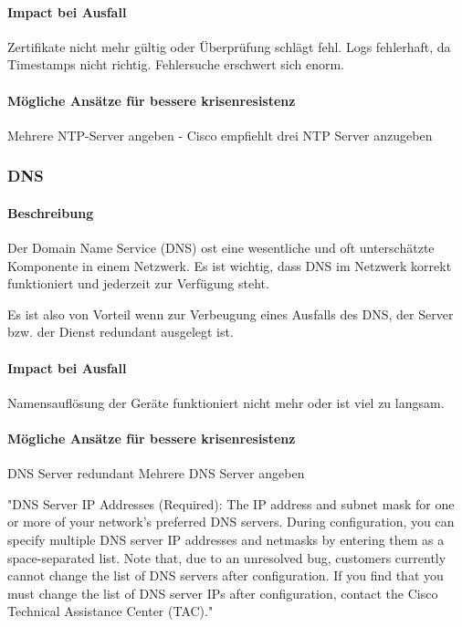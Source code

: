 \paragraph{Impact bei Ausfall}
Zertifikate nicht mehr gültig oder Überprüfung schlägt fehl.
Logs fehlerhaft, da Timestamps nicht richtig. Fehlersuche erschwert sich enorm.

\paragraph{Mögliche Ansätze für bessere krisenresistenz}
Mehrere NTP-Server angeben - Cisco empfiehlt drei NTP Server anzugeben

\subsubsection{DNS}
\paragraph{Beschreibung}
Der Domain Name Service (DNS) ost eine wesentliche und oft unterschätzte Komponente in einem Netzwerk. Es ist wichtig, dass DNS im Netzwerk korrekt funktioniert und jederzeit zur Verfügung steht.

Es ist also von Vorteil wenn zur Verbeugung eines Ausfalls des DNS, der Server bzw. der Dienst redundant ausgelegt ist.

\paragraph{Impact bei Ausfall}
Namensauflösung der Geräte funktioniert nicht mehr oder ist viel zu langsam.


\paragraph{Mögliche Ansätze für bessere krisenresistenz}
DNS Server redundant
Mehrere DNS Server angeben

"DNS Server IP Addresses (Required): The IP address and subnet mask for one or more of your network's preferred DNS servers. During configuration, you can specify multiple DNS server IP addresses and netmasks by entering them as a space-separated list. Note that, due to an unresolved bug, customers currently cannot change the list of DNS servers after configuration. If you find that you must change the list of DNS server IPs after configuration, contact the Cisco Technical Assistance Center (TAC)."

